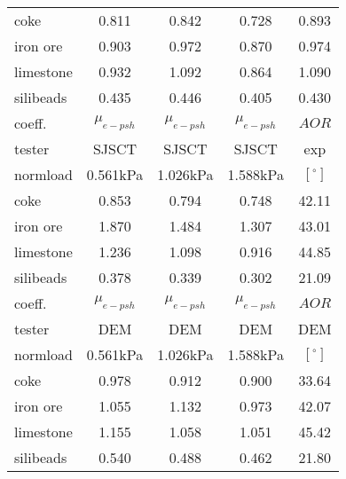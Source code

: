 \begin{table}[htbp]
\begin{tabular}{|lcccc|}
	\hline
	    coke  & 0.811 & 0.842 & 0.728 & 0.893 \\
    iron ore & 0.903 & 0.972 & 0.870 & 0.974 \\
    limestone & 0.932 & 1.092 & 0.864 & 1.090 \\
    silibeads & 0.435 & 0.446 & 0.405 & 0.430 \\
	\hline
	\hline
    coeff. & $\mu_{e-psh}$ & $\mu_{e-psh}$ & $\mu_{e-psh}$ & $AOR$ \\
    tester & SJSCT & SJSCT & SJSCT &  exp\\
    normload & 0.561kPa & 1.026kPa & 1.588kPa & $[^{\circ}]$ \\
	\hline
    coke  & 0.853 & 0.794 & 0.748 & 42.11 \\
    iron ore & 1.870 & 1.484 & 1.307 & 43.01 \\
    limestone & 1.236  & 1.098  & 0.916  & 44.85 \\
    silibeads & 0.378  & 0.339  & 0.302  & 21.09 \\
	\hline
	\hline
    coeff. & $\mu_{e-psh}$ & $\mu_{e-psh}$ & $\mu_{e-psh}$ & $AOR$ \\
    tester & DEM   & DEM   & DEM   & DEM \\
    normload & 0.561kPa & 1.026kPa & 1.588kPa & $[^{\circ}]$ \\
	\hline
    coke  & 0.978 & 0.912 & 0.900 & 33.64 \\
    iron ore & 1.055 & 1.132 & 0.973 & 42.07 \\
    limestone & 1.155 & 1.058 & 1.051 & 45.42 \\
    silibeads & 0.540 & 0.488 & 0.462 & 21.80 \\
	\hline
    \end{tabular}%
  \label{tab:comparisontable}%
\end{table}%
